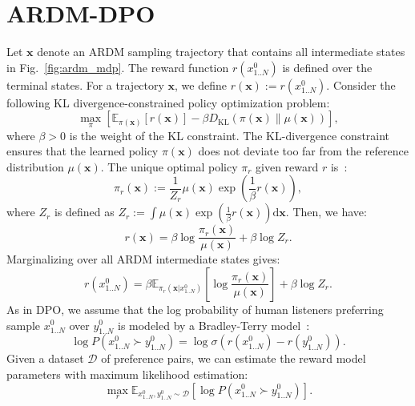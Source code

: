 \documentclass{article}
\begin{document}
\section{ARDM-DPO}
\label{sec:method}

Let $\mathbf{x}$ denote an ARDM sampling trajectory that contains all intermediate states in Fig.~\ref{fig:ardm_mdp}. The reward function $r(x_{1..N}^0)$ is defined over the terminal states. For a trajectory $\mathbf{x}$, we define $r(\mathbf{x}) := r(x_{1..N}^0)$. Consider the following KL divergence-constrained policy optimization problem:
\begin{equation}
\max_{\pi} \left[ \mathbb{E}_{\pi(\mathbf{x})} \left[ r (\mathbf{x}) \right] - \beta D_{\mathrm{KL}}(\pi(\mathbf{x}) \| \mu(\mathbf{x})) \right],
\end{equation}
where $\beta > 0$ is the weight of the KL constraint. The KL-divergence constraint ensures that the learned policy $\pi(\mathbf{x})$ does not deviate too far from the reference distribution $\mu(\mathbf{x})$. The unique optimal policy $\pi_r$ given reward $r$ is~\cite{DPO,AWR}:
\begin{equation}
\pi_r(\mathbf{x}) := \frac{1}{Z_r} \mu(\mathbf{x}) \exp \left( \frac{1}{\beta} r(\mathbf{x}) \right),
\end{equation}
where $Z_r$ is defined as $Z_r := \int \mu(\mathbf{x}) \exp\left( \frac{1}{\beta} r(\mathbf{x}) \right) \mathrm{d} \mathbf{x}$. Then, we have:
\begin{equation}
r(\mathbf{x}) = \beta \log \frac{\pi_r(\mathbf{x})}{\mu(\mathbf{x})} + \beta \log Z_r.
\end{equation}
Marginalizing over all ARDM intermediate states gives:
\begin{equation}
\label{eq:r_as_log_ratio}
r(x_{1..N}^0) = \beta \mathbb{E}_{\pi_r(\mathbf{x} | x_{1..N}^0)} \left[ \log \frac{\pi_r(\mathbf{x})}{\mu(\mathbf{x})} \right] + \beta \log Z_r.  
\end{equation}
As in DPO, we assume that the log probability of human listeners preferring sample $x_{1..N}^0$ over $y_{1..N}^0$ is modeled by a Bradley-Terry model~\cite{DPO}:
\begin{equation}
\log P(x_{1..N}^0 \succ y_{1..N}^0) = \log \sigma \left( r(x_{1..N}^0) - r(y_{1..N}^0) \right).
\end{equation}
Given a dataset $\mathcal D$ of preference pairs, we can estimate the reward model parameters with maximum likelihood estimation:
\begin{equation}
\max_{r} \mathbb{E}_{x_{1..N}^0, y_{1..N}^0 \sim \mathcal{D}} \left[\log P(x_{1..N}^0 \succ y_{1..N}^0)\right].
\end{equation}
\end{document}
